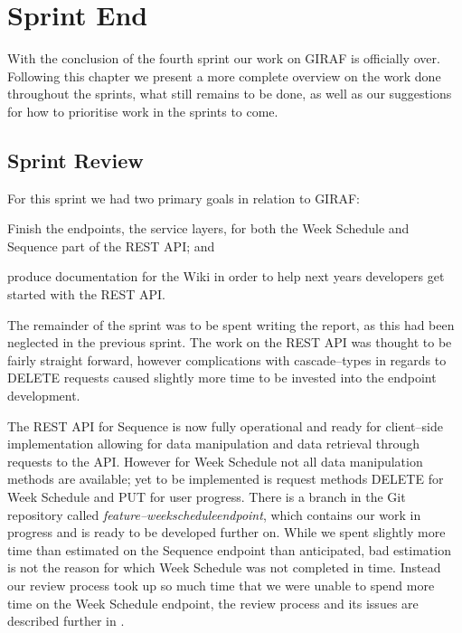 \chapter{Sprint End}
With the conclusion of the fourth sprint our work on GIRAF is officially over.
Following this chapter we present a more complete overview on the work done throughout the sprints, what still remains to be done, as well as our suggestions for how to prioritise work in the sprints to come.

\section{Sprint Review}
For this sprint we had two primary goals in relation to GIRAF:
\begin{enumberate*}
\item Finish the endpoints, the service layers, for both the Week Schedule and Sequence part of the REST API; and
\item produce documentation for the Wiki in order to help next years developers get started with the REST API.
\end{enumberate*}
The remainder of the sprint was to be spent writing the report, as this had been neglected in the previous sprint. 
The work on the REST API was thought to be fairly straight forward, however complications with cascade--types in regards to DELETE requests caused slightly more time to be invested into the endpoint development.

The REST API for Sequence is now fully operational and ready for client--side implementation allowing for data manipulation and data retrieval through requests to the API.
However for  Week Schedule not all data manipulation methods are available; yet to be implemented is request methods DELETE for Week Schedule and PUT for user progress.
There is a branch in the Git repository called \textit{feature--weekscheduleendpoint}, which contains our work in progress and is ready to be developed further on.
While we spent slightly more time than estimated on the Sequence endpoint than anticipated, bad estimation is not the reason for which Week Schedule was not completed in time.
Instead our review process took up so much time that we were unable to spend more time on the Week Schedule endpoint, the review process and its issues are described further in .

